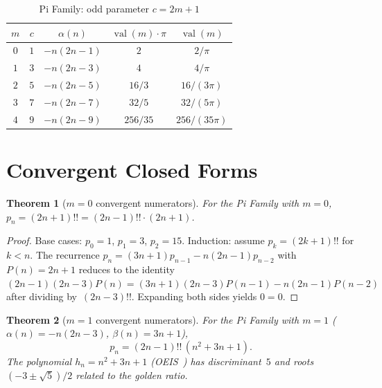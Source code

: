 \documentclass[11pt,a4paper]{article}
\theoremstyle{plain}
\newtheorem{theorem}{Theorem}[section]
\theoremstyle{definition}
\theoremstyle{remark}
\newcommand{\dff}[1]{(#1)!!}
\begin{document}
\begin{table}[ht]
\centering
\caption{Pi Family: odd parameter $c = 2m{+}1$}\label{tab:pi}
\begin{tabular}{@{}ccccc@{}}
\toprule
$m$ & $c$ & $\alpha(n)$ & $\operatorname{val}(m)\cdot\pi$ &
$\operatorname{val}(m)$ \\
\midrule
$0$ & $1$ & $-n(2n{-}1)$ & $2$ & $2/\pi$ \\
$1$ & $3$ & $-n(2n{-}3)$ & $4$ & $4/\pi$ \\
$2$ & $5$ & $-n(2n{-}5)$ & $16/3$ & $16/(3\pi)$ \\
$3$ & $7$ & $-n(2n{-}7)$ & $32/5$ & $32/(5\pi)$ \\
$4$ & $9$ & $-n(2n{-}9)$ & $256/35$ & $256/(35\pi)$ \\
\bottomrule
\end{tabular}
\end{table}

\section{Convergent Closed Forms}\label{sec:closed}

\begin{theorem}[$m=0$ convergent numerators]\label{thm:conv0}
For the Pi Family with $m=0$,
$p_n = (2n{+}1)!! = \dff{2n{-}1}\cdot(2n{+}1)$.
\end{theorem}

\begin{proof}
Base cases: $p_0{=}1$, $p_1{=}3$, $p_2{=}15$.
Induction: assume $p_k = (2k{+}1)!!$ for $k < n$.
The recurrence $p_n = (3n{+}1)p_{n-1} - n(2n{-}1)p_{n-2}$
with $P(n) = 2n{+}1$ reduces to the identity
$(2n{-}1)(2n{-}3)P(n) = (3n{+}1)(2n{-}3)P(n{-}1) - n(2n{-}1)P(n{-}2)$
after dividing by~$\dff{2n{-}3}$.
Expanding both sides yields $0 = 0$.
\end{proof}

\begin{theorem}[$m=1$ convergent numerators]\label{thm:conv1}
For the Pi Family with $m=1$ ($\alpha(n) = -n(2n{-}3)$,
$\beta(n) = 3n{+}1$),
\begin{equation}\label{eq:pn_m1}
  p_n = \dff{2n{-}1}\,(n^2 + 3n + 1).
\end{equation}
The polynomial $h_n = n^2{+}3n{+}1$ (OEIS~\cite{oeis_A028387})
has discriminant~$5$ and
roots $(-3 \pm \sqrt{5})/2$ related to the golden ratio.
\end{theorem}
\end{document}
